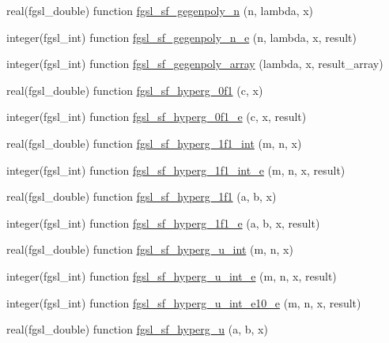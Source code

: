 \begin{DoxyCompactItemize}
\item 
real(fgsl\+\_\+double) function \hyperlink{specfunc_8finc_a877dc1a2a3dfef5095b7d1ecea26148d}{fgsl\+\_\+sf\+\_\+gegenpoly\+\_\+n} (n, lambda, x)
\item 
integer(fgsl\+\_\+int) function \hyperlink{specfunc_8finc_a12853ef98eefd27714b71133da5b7c20}{fgsl\+\_\+sf\+\_\+gegenpoly\+\_\+n\+\_\+e} (n, lambda, x, result)
\item 
integer(fgsl\+\_\+int) function \hyperlink{specfunc_8finc_a5d526a22fa1e670eafb72e4722736a93}{fgsl\+\_\+sf\+\_\+gegenpoly\+\_\+array} (lambda, x, result\+\_\+array)
\item 
real(fgsl\+\_\+double) function \hyperlink{specfunc_8finc_ab35818a0e5fc4a0a82aa9fba39555bc9}{fgsl\+\_\+sf\+\_\+hyperg\+\_\+0f1} (c, x)
\item 
integer(fgsl\+\_\+int) function \hyperlink{specfunc_8finc_a07945fd0ca236c371ebcfd276b4fa79e}{fgsl\+\_\+sf\+\_\+hyperg\+\_\+0f1\+\_\+e} (c, x, result)
\item 
real(fgsl\+\_\+double) function \hyperlink{specfunc_8finc_a27fb68a134070920937fea3f8a9d4a5a}{fgsl\+\_\+sf\+\_\+hyperg\+\_\+1f1\+\_\+int} (m, n, x)
\item 
integer(fgsl\+\_\+int) function \hyperlink{specfunc_8finc_a3fdaf30a4ab2665297ec2062b509a847}{fgsl\+\_\+sf\+\_\+hyperg\+\_\+1f1\+\_\+int\+\_\+e} (m, n, x, result)
\item 
real(fgsl\+\_\+double) function \hyperlink{specfunc_8finc_a5c5a56079183e6da71e9d512ff325ba9}{fgsl\+\_\+sf\+\_\+hyperg\+\_\+1f1} (a, b, x)
\item 
integer(fgsl\+\_\+int) function \hyperlink{specfunc_8finc_a1654064106d18ac64d8bd8c77c3e8797}{fgsl\+\_\+sf\+\_\+hyperg\+\_\+1f1\+\_\+e} (a, b, x, result)
\item 
real(fgsl\+\_\+double) function \hyperlink{specfunc_8finc_ab4ff7b25632e1df2e941b857d3b3345d}{fgsl\+\_\+sf\+\_\+hyperg\+\_\+u\+\_\+int} (m, n, x)
\item 
integer(fgsl\+\_\+int) function \hyperlink{specfunc_8finc_ae52effddd477a734a5228e61d6b52cd6}{fgsl\+\_\+sf\+\_\+hyperg\+\_\+u\+\_\+int\+\_\+e} (m, n, x, result)
\item 
integer(fgsl\+\_\+int) function \hyperlink{specfunc_8finc_aba822c9be62292db8b3571bb22345e23}{fgsl\+\_\+sf\+\_\+hyperg\+\_\+u\+\_\+int\+\_\+e10\+\_\+e} (m, n, x, result)
\item 
real(fgsl\+\_\+double) function \hyperlink{specfunc_8finc_ae25339fd752554a568356d5fe08c3d91}{fgsl\+\_\+sf\+\_\+hyperg\+\_\+u} (a, b, x)
\item 

\end{DoxyCompactItemize}

